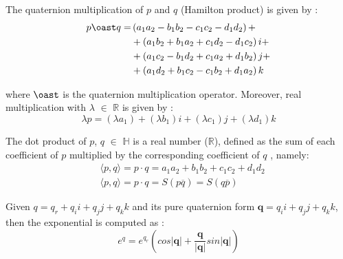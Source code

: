 \documentclass[superscriptaddress,longbibliography,aps,prl,twocolumn,10pt]{revtex4-2}
\begin{document}
\noindent
The quaternion multiplication of $p$ and $q$ (Hamilton product) is given by \cite{Morais2014}:
    \begin{equation} \label{eq:quaternionmultiplication}
    \begin{aligned}
        p \oast q = &\left( {{a_1}{a_2} - {b_1}{b_2} - {c_1}{c_2} - {d_1}{d_2}} \right) +\\
        &+ \left( {{a_1}{b_2} + {b_1}{a_2} + {c_1}{d_2} - {d_1}{c_2}} \right)i +\\
        &+\left( {{a_1}{c_2} - {b_1}{d_2} + {c_1}{a_2} + {d_1}{b_2}} \right)j +\\
        &+\left( {{a_1}{d_2} + {b_1}{c_2} - {c_1}{b_2} + {d_1}{a_2}} \right)k
    \end{aligned}
    \end{equation}
    
\noindent
where $\oast$ is the quaternion multiplication operator. Moreover, real multiplication with $\lambda$ $\in$ $\mathbb{R}$ is given by \cite{Morais2014}:
    \begin{equation} \label{eq:realmultiplication}
        \lambda p = \left( {\lambda a{_1}} \right) + \left( {\lambda b{_1}} \right)i + \left( {\lambda c{_1}} \right)j + \left( {\lambda d{_1}} \right)k
    \end{equation}

\noindent
The dot product of $p$, $q$ $\in$ $\mathbb{H}$ is a real number ($\mathbb{R}$), defined as the sum of each coefficient of $p$ multiplied by the corresponding coefficient of $q$ \cite{Morais2014}, namely:
    \begin{equation} \label{eq:dotproduct}
    \begin{aligned}
        &\langle p,q \rangle = p \cdot q = {{a_1}{a_2} + {b_1}{b_2} + {c_1}{c_2} + {d_1}{d_2}} \\
        &\langle p,q \rangle = p \cdot q = S \left(p \overline q \right) = S \left(q \overline p \right)
    \end{aligned}
    \end{equation}

\noindent
Given $q = {q_r} + {q_i}i + {q_j}j + {q_k}k$ and its pure quaternion form $\boldsymbol{q} = {q_i}i + {q_j}j + {q_k}k$, then the exponential is computed as \cite{Morais2014, 1711.02508}:
    \begin{equation} \label{eq:exponential}
        e^{q} = e^{q_r} \left(cos\left| \boldsymbol{q} \right| + \frac{\boldsymbol{q}}{\left| \boldsymbol{q} \right|} sin\left| \boldsymbol{q} \right| \right)
    \end{equation}
\end{document}
